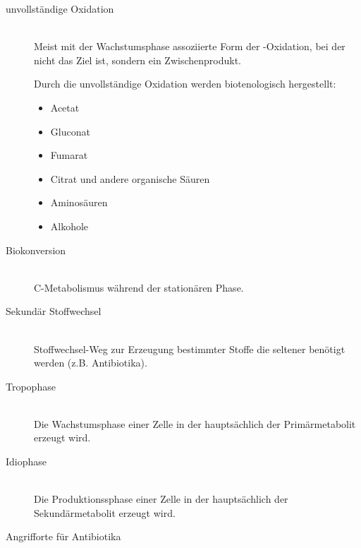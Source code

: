 \begin{description}
	\item[unvollständige Oxidation] \hfill \\
		Meist mit der Wachstumsphase assoziierte Form der -Oxidation,
		bei der nicht  das Ziel ist, sondern ein Zwischenprodukt.

		Durch die unvollständige Oxidation werden biotenologisch hergestellt:
		
		\begin{itemize}
			\item Acetat
			\item Gluconat
			\item Fumarat
			\item Citrat und andere organische Säuren
			\item Aminosäuren
			\item Alkohole
		\end{itemize}

	\item[Biokonversion] \hfill \\
		C-Metabolismus während der stationären Phase. %

	\item[Sekundär Stoffwechsel] \hfill \\
		Stoffwechsel-Weg zur Erzeugung bestimmter Stoffe die seltener benötigt werden
		(z.B. Antibiotika).

	\item[Tropophase] \hfill \\
		Die Wachstumsphase einer Zelle in der hauptsächlich der Primärmetabolit erzeugt wird.

	\item[Idiophase] \hfill \\
		Die Produktionssphase einer Zelle in der hauptsächlich der Sekundärmetabolit erzeugt wird.

	\item[Angrifforte für Antibiotika] \hfill \\


\end{description}
